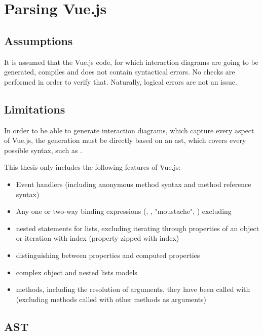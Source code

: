 
\section{Parsing Vue.js}

\subsection{Assumptions}
It is assumed that the Vue.js code, for which interaction diagrams are going to be generated, compiles and does not contain syntactical errors. No checks are performed in order to verify that. Naturally, logical errors are not an issue.
\subsection{Limitations}
\label{concept:parsing_limits}

In order to be able to generate interaction diagrams, which capture every aspect of Vue.js, the generation must be directly based on an \gls{ast}, which covers every possible syntax, such as \cite{eslint_vue_parser}. 

This thesis only includes the following features of Vue.js:
\begin{itemize}
    \item Event handlers (including anonymous method syntax and method reference syntax)
    \item Any one or two-way binding expressions (, , "moustache", ) excluding 
    \item nested  statements for lists, excluding iterating through properties of an object or iteration with index (property zipped with index)
    \item distinguishing between properties and computed properties
    \item complex object and nested lists models 
    \item methods, including the resolution of arguments, they have been called with (excluding methods called with other methods as arguments)
\end{itemize}

\subsection{AST}

